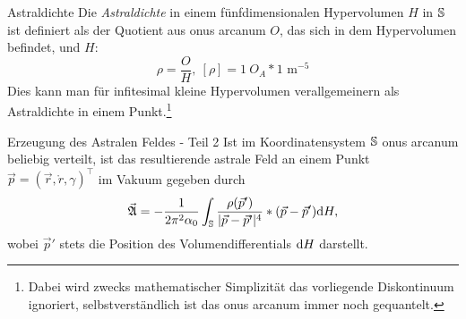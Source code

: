 \begin{bla}{Astraldichte}
Die \emph{Astraldichte} in einem fünfdimensionalen Hypervolumen $H$ in $\mathbb{S}$ ist definiert als der Quotient aus onus arcanum $O$, das sich in dem Hypervolumen befindet, und $H$:
\begin{equation}
\rho=\frac{O}{H},\ [\rho]=1\ O_A*1\text{ m}^{-5}
\end{equation}
Dies kann man für infitesimal kleine Hypervolumen verallgemeinern als Astraldichte in einem Punkt.\footnote{Dabei wird zwecks mathematischer Simplizität das vorliegende Diskontinuum ignoriert, selbstverständlich ist das onus arcanum immer noch gequantelt.}
\end{bla}
\begin{bla}{Erzeugung des Astralen Feldes - Teil 2}
Ist im Koordinatensystem $\mathbb{S}$ onus arcanum beliebig verteilt, ist das resultierende astrale Feld an einem Punkt $\vec{p}=(\vec{r},\mathring{r},\gamma)^\top$ im Vakuum gegeben durch
\begin{equation}
\vec{\mathfrak{A}}=-\frac{1}{2\pi^2\alpha_0}\int_{\mathbb{S}}\frac{\rho(\vec{p}')}{|\vec{p}-\vec{p}'|^4}*(\vec{p}-\vec{p}')\text{\rmfamily d} H,
\end{equation}
wobei $\vec{p}'$ stets die Position des Volumendifferentials $\text{\rmfamily d} H$ darstellt.
\end{bla}
